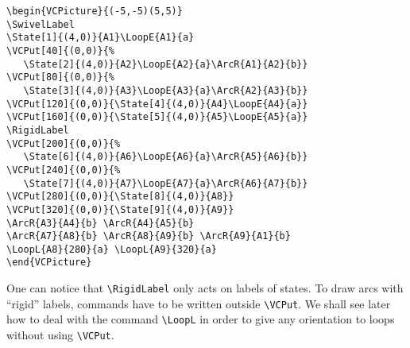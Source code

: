 \documentclass[11pt,twoside]{article}
\newlength{\parindenttemp} %
\newcommand{\noi}{\noindent}
\newlength{\jsIndent}%
\newlength{\ColSource}%
\newlength{\ColFigur}%
\begin{document}
\medskip
\noi 
\hspace*{-\jsIndent}
\begin{minipage}[c]{\ColFigur}%
\par\vspace*{0mm}%
\begin{center}
\SmallPicture{}%
\end{center}
\end{minipage}%
\hspace*{1.2em}%
\begin{minipage}[c]{\ColSource}
\setlength{\parindent}{\parindenttemp}%
\par\vspace*{0mm}%
\footnotesize
\begin{verbatim}
\begin{VCPicture}{(-5,-5)(5,5)}
\SwivelLabel
\State[1]{(4,0)}{A1}\LoopE{A1}{a}
\VCPut[40]{(0,0)}{%
   \State[2]{(4,0)}{A2}\LoopE{A2}{a}\ArcR{A1}{A2}{b}}
\VCPut[80]{(0,0)}{%
   \State[3]{(4,0)}{A3}\LoopE{A3}{a}\ArcR{A2}{A3}{b}}
\VCPut[120]{(0,0)}{\State[4]{(4,0)}{A4}\LoopE{A4}{a}}
\VCPut[160]{(0,0)}{\State[5]{(4,0)}{A5}\LoopE{A5}{a}}
\RigidLabel
\VCPut[200]{(0,0)}{%
   \State[6]{(4,0)}{A6}\LoopE{A6}{a}\ArcR{A5}{A6}{b}}
\VCPut[240]{(0,0)}{%
   \State[7]{(4,0)}{A7}\LoopE{A7}{a}\ArcR{A6}{A7}{b}}
\VCPut[280]{(0,0)}{\State[8]{(4,0)}{A8}}
\VCPut[320]{(0,0)}{\State[9]{(4,0)}{A9}}
\ArcR{A3}{A4}{b} \ArcR{A4}{A5}{b}
\ArcR{A7}{A8}{b} \ArcR{A8}{A9}{b} \ArcR{A9}{A1}{b}
\LoopL{A8}{280}{a} \LoopL{A9}{320}{a}
\end{VCPicture}
\end{verbatim}
\normalsize
\end{minipage}%

One can notice that \verb+\RigidLabel+ only acts on labels of states.
To draw arcs with ``rigid'' labels, commands have to be written outside
\verb+\VCPut+. We shall see later how to deal with the command \verb+\LoopL+
in order to give any orientation to loops without using \verb+\VCPut+.
\end{document}
